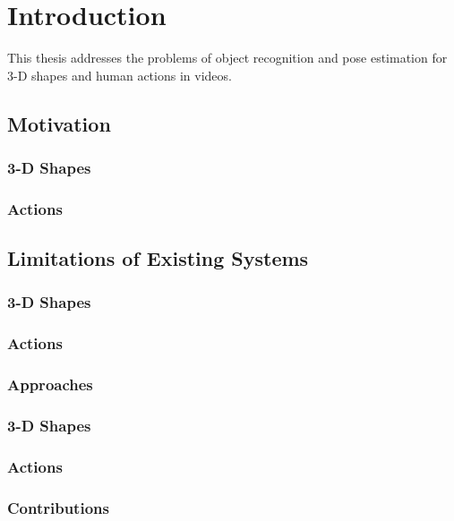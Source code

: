 \chapter{Introduction}
\label{chap/intro} 



This thesis addresses the problems of object recognition and pose estimation for 3-D shapes and human actions in videos. 

\section{Motivation}  

\subsection{3-D Shapes}

\subsection{Actions} 

\section{Limitations of Existing Systems}

\subsection{3-D Shapes}

\subsection{Actions}

\subsection{Approaches}

\subsection{3-D Shapes} 

\subsection{Actions}

\subsection{Contributions}

